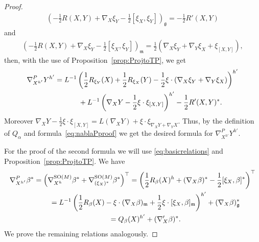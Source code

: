 \documentclass[10pt,a4paper]{amsart}
\numberwithin{equation}{section}
\begin{document}
\begin{proof}
\begin{gather*}
\left(-\frac{1}{2}R(X,Y)+\nabla_X\xi_Y-\frac{1}{2}[\xi_X,\xi_Y]\right)_{\mathfrak{g}}=-\frac{1}{2}R'(X,Y)
\end{gather*}
and
\begin{gather*}
\left(-\frac{1}{2}R(X,Y)+\nabla_X\xi_Y-\frac{1}{2}[\xi_X,\xi_Y]\right)_{\mathfrak{m}}=\frac{1}{2}\left( \nabla_X\xi_Y+\nabla_Y\xi_X+\xi_{[X,Y]} \right),
\end{gather*}
then, with the use of Proposition~\ref{prop:ProjtoTP}, we get
\begin{gather*}
\nabla^P_{X^{h'}}Y^{h'}=L^{-1}\left(\frac{1}{2}R_{\xi_Y}(X)+\frac{1}{2}R_{\xi_X}(Y)-\frac{1}{2}\xi\cdot(\nabla_X\xi_Y+\nabla_Y\xi_X)\right)^{h'}\\
\hphantom{\nabla^P_{X^{h'}}Y^{h'}=}{}
+L^{-1}\left(\nabla_XY-\frac{1}{2}\xi\cdot\xi_{[X,Y]}\right)^{h'}-\frac{1}{2}R'(X,Y)^{\ast}.
\end{gather*}
Moreover $\nabla_XY-\frac{1}{2}\xi\cdot\xi_{[X,Y]}=L(\nabla_XY)+\xi\cdot\xi_{\nabla_XY+\nabla_YX}$. Thus, by the def\/inition of $Q_{\alpha}$ and formula~\eqref{eq:nablaPproof} we get the desired formula for $\nabla^P_{X^{h'}}Y^{h'}$.

For the proof of the second formula we will use \eqref{eq:basicrelations} and Proposition~\ref{prop:ProjtoTP}. We have
\begin{gather*}
\nabla^P_{X^{h'}}\beta^{\ast} =\left( \nabla^{{\rm SO}(M)}_{X^h}\beta^{\ast}
+\nabla^{{\rm SO}(M)}_{(\xi_X)^{\ast}}\beta^{\ast} \right)^{\top} =\left(\frac{1}{2}R_{\beta}(X)^h+(\nabla_X\beta)^{\ast}-\frac{1}{2}[\xi_X,\beta]^{\ast}\right)^{\top}\\
\hphantom{\nabla^P_{X^{h'}}\beta^{\ast}}{}
=L^{-1}\left(\frac{1}{2}R_{\beta}(X)-\xi\cdot(\nabla_X\beta)_{\mathfrak{m}}+\frac{1}{2}\xi\cdot[\xi_X,\beta]_{\mathfrak{m}}\right)^{h'}
+(\nabla_X\beta)^{\ast}_{\mathfrak{g}}\\
\hphantom{\nabla^P_{X^{h'}}\beta^{\ast}}{}
=Q_{\beta}(X)^{h'}+(\nabla'_X\beta)^{\ast}.
\end{gather*}
We prove the remaining relations analogously.
\end{proof}
\end{document}
